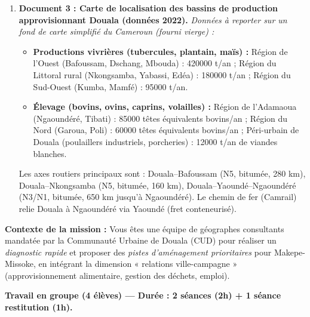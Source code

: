\documentclass[11pt]{article}
\newcounter{popsec}
\newcounter{popsub}
\newcommand{\courssub}[1]{%
  \stepcounter{popsub}%
  \par\vspace{9pt}\noindent{\popxbold\fontsize{11.5}{13}\selectfont\color{popink}{\color{poporange}\thepopsec.\thepopsub}\hspace{6pt}#1}\par\nopagebreak\vspace{4pt}
}
\begin{document}
\begin{enumerate}
    \item \textbf{Document 3 : Carte de localisation des bassins de production approvisionnant Douala (données 2022).}
    \emph{Données à reporter sur un fond de carte simplifié du Cameroun (fourni vierge) :}
    \begin{itemize}
        \item \textbf{Productions vivrières (tubercules, plantain, maïs) :} Région de l'Ouest (Bafoussam, Dschang, Mbouda) : \num{420 000} t/an ; Région du Littoral rural (Nkongsamba, Yabassi, Edéa) : \num{180 000} t/an ; Région du Sud-Ouest (Kumba, Mamfé) : \num{95 000} t/an.
        \item \textbf{Élevage (bovins, ovins, caprins, volailles) :} Région de l'Adamaoua (Ngaoundéré, Tibati) : \num{85 000} têtes équivalents bovins/an ; Région du Nord (Garoua, Poli) : \num{60 000} têtes équivalents bovins/an ; Péri-urbain de Douala (poulaillers industriels, porcheries) : \num{12 000} t/an de viandes blanches.
    \end{itemize}
    Les axes routiers principaux sont : Douala--Bafoussam (N5, bitumée, \num{280} km), Douala--Nkongsamba (N5, bitumée, \num{160} km), Douala--Yaoundé--Ngaoundéré (N3/N1, bitumée, \num{650} km jusqu'à Ngaoundéré). Le chemin de fer (Camrail) relie Douala à Ngaoundéré via Yaoundé (fret conteneurisé).
\end{enumerate}

\vspace{0,5em}
\textbf{Contexte de la mission :} Vous êtes une équipe de géographes consultants mandatée par la Communauté Urbaine de Douala (CUD) pour réaliser un \emph{diagnostic rapide} et proposer des \emph{pistes d'aménagement prioritaires} pour Makepe-Missoke, en intégrant la dimension « relations ville-campagne » (approvisionnement alimentaire, gestion des déchets, emploi).

\courssub{Consignes}
\textbf{Travail en groupe (4 élèves) — Durée : 2 séances (2h) + 1 séance restitution (1h).}
\end{document}
